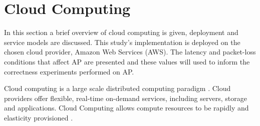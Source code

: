 %






\section{Cloud Computing}
In this section a brief overview of cloud computing is given, deployment and service models are discussed. This study's implementation is deployed on the chosen cloud provider, Amazon Web Services (AWS). The latency and packet-loss conditions that affect AP are presented and these values will used to inform the correctness experiments performed on AP.


Cloud computing is a large scale distributed computing paradigm \cite{2008CloudComputing}. Cloud providers offer flexible, real-time on-demand services, including servers, storage and applications. Cloud Computing allows compute resources to be rapidly and elasticity provisioned \cite{2012CloudComputing}.

